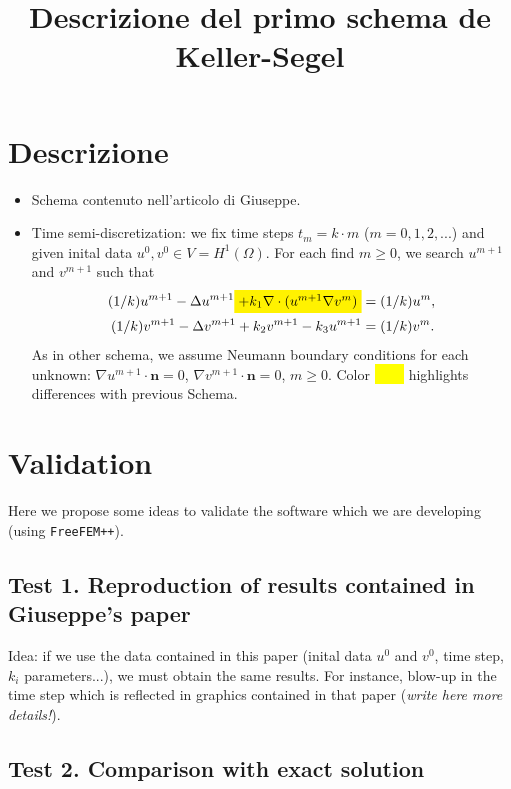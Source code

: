 \documentclass[a4wide]{article}
\title{Descrizione del primo schema de Keller-Segel}
\newcommand{\um}{u^m}
\newcommand{\umm}{u^{m+1}}
\newcommand{\vm}{v^m}
\newcommand{\vmm}{v^{m+1}}
\newcommand{\grad}{\nabla}
\renewcommand{\div}{\nabla\cdot}
\newcommand{\nn}{\mathbf{n}}
\newcommand{\hm}[1]{\colorbox{yellow}{\ensuremath{#1}}}
\begin{document}
\maketitle

\section{Descrizione}

\begin{itemize}
\item Schema contenuto nell'articolo di Giuseppe.
\item Time
  semi-discretization: we fix time steps $t_m=k\cdot m$
  ($m=0,1,2,...$) and given inital data $u^0,v^0 \in
  V=H^1(\Omega)$.
  For each find $m\ge 0$, we search $\umm$ and $\vmm$ such that
  \begin{align}
    \label{eq:ks.1}
    (1/k) \umm - \Delta \umm \hm{+ k_1 \div(\umm \grad \vm)}&= (1/k) \um ,
    \\
    \label{eq:ks.2}
    (1/k) \vmm - \Delta \vmm + k_2 \vmm - k_3 \umm &= (1/k) \vm .
  \end{align}
  As in other schema, we assume Neumann boundary conditions for each unknown:
  $\grad \umm \cdot \nn=0$, $\grad \vmm \cdot \nn=0$, $m\ge 0$.
  Color \hm{\qquad\rule{0pt}{1ex}} highlights differences with previous Schema.
\end{itemize}

\section{Validation}
Here we propose some ideas to validate the software
which we are developing (using \texttt{FreeFEM++}).

\subsection*{Test 1. Reproduction of results contained in Giuseppe's paper}

Idea: if we use the data contained in this paper (inital data $u^0$
and $v^0$, time step, $k_i$ parameters...), we must obtain the same
results. For instance, blow-up in the time step which is reflected in
graphics contained in that paper (\textit{write here more details!}).

\subsection*{Test 2. Comparison with exact solution}
\end{document}

